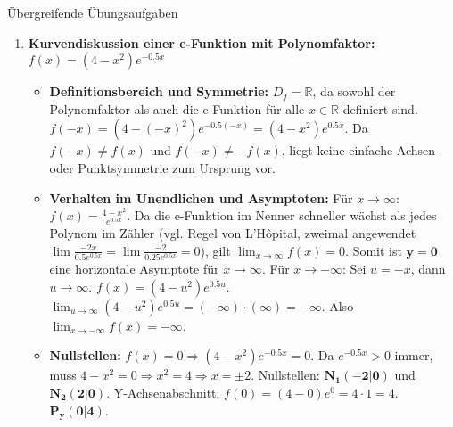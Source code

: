 \begin{loesungsumgebung}{Übergreifende Übungsaufgaben}

\begin{enumerate}
    \item \textbf{Kurvendiskussion einer e-Funktion mit Polynomfaktor: $f(x) = (4-x^2)e^{-0.5x}$}
    \begin{itemize}
        \item \textbf{Definitionsbereich und Symmetrie:}
        $D_f = \mathbb{R}$, da sowohl der Polynomfaktor als auch die e-Funktion für alle $x \in \mathbb{R}$ definiert sind.
        $f(-x) = (4-(-x)^2)e^{-0.5(-x)} = (4-x^2)e^{0.5x}$.
        Da $f(-x) \neq f(x)$ und $f(-x) \neq -f(x)$, liegt keine einfache Achsen- oder Punktsymmetrie zum Ursprung vor.

        \item \textbf{Verhalten im Unendlichen und Asymptoten:}
        Für $x \to \infty$: $f(x) = \frac{4-x^2}{e^{0.5x}}$. Da die e-Funktion im Nenner schneller wächst als jedes Polynom im Zähler (vgl. Regel von L'Hôpital, zweimal angewendet $\lim \frac{-2x}{0.5e^{0.5x}} = \lim \frac{-2}{0.25e^{0.5x}} = 0$), gilt $\lim_{x\to\infty} f(x) = 0$.
        Somit ist $\mathbf{y=0}$ eine horizontale Asymptote für $x \to \infty$.
        Für $x \to -\infty$: Sei $u=-x$, dann $u \to \infty$. $f(x) = (4-u^2)e^{0.5u}$.
        $\lim_{u\to\infty} (4-u^2)e^{0.5u} = (-\infty) \cdot (\infty) = -\infty$. Also $\lim_{x\to-\infty} f(x) = -\infty$.

        \item \textbf{Nullstellen:}
        $f(x)=0 \Rightarrow (4-x^2)e^{-0.5x}=0$. Da $e^{-0.5x} > 0$ immer, muss $4-x^2=0 \Rightarrow x^2=4 \Rightarrow x=\pm 2$.
        Nullstellen: $\mathbf{N_1(-2|0)}$ und $\mathbf{N_2(2|0)}$.
        Y-Achsenabschnitt: $f(0)=(4-0)e^0 = 4 \cdot 1 = 4$. $\mathbf{P_y(0|4)}$.


\end{itemize}
\end{enumerate}
\end{loesungsumgebung}
